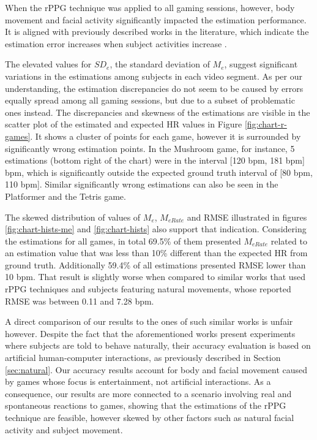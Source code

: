 When the rPPG technique was applied to all gaming sessions, however, body movement and facial activity significantly impacted the estimation performance. It is aligned with previously described works in the literature, which indicate the estimation error increases when subject activities increase \parencite{Wang_2016novel}.

The elevated values for $SD_e$, the standard deviation of $M_e$, suggest significant variations in the estimations among subjects in each video segment. As per our understanding, the estimation discrepancies do not seem to be caused by errors equally spread among all gaming sessions, but due to a subset of problematic ones instead. The discrepancies and skewness of the estimations are visible in the scatter plot of the estimated and expected HR values in Figure \ref{fig:chart-r-games}. It shows a cluster of points for each game, however it is surrounded by significantly wrong estimation points. In the Mushroom game, for instance, 5 estimations (bottom right of the chart) were in the interval [120 bpm, 181 bpm] bpm, which is significantly outside the expected ground truth interval of [80 bpm, 110 bpm]. Similar significantly wrong estimations can also be seen in the Platformer and the Tetris game.

The skewed distribution of values of $M_e$, $M_{eRate}$ and RMSE illustrated in figures \ref{fig:chart-hists-me} and \ref{fig:chart-hists} also support that indication. Considering the estimations for all games, in total 69.5\% of them presented $M_{eRate}$ related to an estimation value that was less than 10\% different than the expected HR from ground truth. Additionally 59.4\% of all estimations presented RMSE lower than 10 bpm. That result is slightly worse when compared to similar works that used rPPG techniques and subjects featuring natural movements, whose reported RMSE was between 0.11 and 7.28 bpm.

A direct comparison of our results to the ones of such similar works is unfair however. Despite the fact that the aforementioned works present experiments where subjects are told to behave naturally, their accuracy evaluation is based on artificial human-computer interactions, as previously described in Section \ref{sec:natural}. Our accuracy results account for body and facial movement caused by games whose focus is entertainment, not artificial interactions. As a consequence, our results are more connected to a scenario involving real and spontaneous reactions to games, showing that the estimations of the rPPG technique are feasible, however skewed by other factors such as natural facial activity and subject movement.

